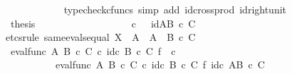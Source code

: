 \begin{isabellebody}
\ \ \ \ \ \ \ \ \ \ \isamarkupfalse%
\ {\isacharparenleft}{\kern0pt}typecheck{\isacharunderscore}{\kern0pt}cfuncs{\isacharcomma}{\kern0pt}\ simp\ add{\isacharcolon}{\kern0pt}\ id{\isacharunderscore}{\kern0pt}cross{\isacharunderscore}{\kern0pt}prod\ id{\isacharunderscore}{\kern0pt}right{\isacharunderscore}{\kern0pt}unit{}{\isacharparenright}{\kern0pt}\isanewline
\ \ \ \ \ \ \ \ \isamarkupfalse%
\ \isamarkupfalse%
\ {\isacharquery}{\kern0pt}thesis\isacommand{{\isachardot}{\kern0pt}}\isamarkupfalse%
\isanewline
\ \ \ \ \ \ \isamarkupfalse%
\isanewline
\ \ \ \ \isamarkupfalse%
\isanewline
\ \ \isamarkupfalse%
\isanewline
\ \ \isamarkupfalse%
\ {\isachardoublequoteopen}{\isasympsi}\isactrlsup {\isasymsharp}\ {\isasymcirc}\isactrlsub c\ {\isasymphi}\isactrlsup {\isasymsharp}\isactrlsup {\isasymsharp}\ {\isacharequal}{\kern0pt}\ id{\isacharparenleft}{\kern0pt}A\isactrlbsup {\isacharparenleft}{\kern0pt}B\ {\isasymtimes}\isactrlsub c\ C{\isacharparenright}{\kern0pt}\isactrlesup {\isacharparenright}{\kern0pt}{\isachardoublequoteclose}\isanewline
\ \ \isamarkupfalse%
{\isacharparenleft}{\kern0pt}etcs{\isacharunderscore}{\kern0pt}rule\ same{\isacharunderscore}{\kern0pt}evals{\isacharunderscore}{\kern0pt}equal{\isacharbrackleft}{\kern0pt}\ X\ {\isacharequal}{\kern0pt}\ {\isachardoublequoteopen}A{\isachardoublequoteclose}{\isacharcomma}{\kern0pt}\ \ A\ {\isacharequal}{\kern0pt}\ {\isachardoublequoteopen}{\isacharparenleft}{\kern0pt}B\ {\isasymtimes}\isactrlsub c\ C{\isacharparenright}{\kern0pt}{\isachardoublequoteclose}{\isacharbrackright}{\kern0pt}{\isacharparenright}{\kern0pt}\isanewline
\ \ \ \ \isamarkupfalse%
\ {\isachardoublequoteopen}eval{\isacharunderscore}{\kern0pt}func\ A\ {\isacharparenleft}{\kern0pt}B\ {\isasymtimes}\isactrlsub c\ C{\isacharparenright}{\kern0pt}\ {\isasymcirc}\isactrlsub c\ {\isacharparenleft}{\kern0pt}id\isactrlsub c\ {\isacharparenleft}{\kern0pt}B\ {\isasymtimes}\isactrlsub c\ C{\isacharparenright}{\kern0pt}\ {\isasymtimes}\isactrlsub f\ {\isacharparenleft}{\kern0pt}{\isasympsi}\isactrlsup {\isasymsharp}\ {\isasymcirc}\isactrlsub c\ {\isasymphi}\isactrlsup {\isasymsharp}\isactrlsup {\isasymsharp}{\isacharparenright}{\kern0pt}{\isacharparenright}{\kern0pt}\ {\isacharequal}{\kern0pt}\ \isanewline
\ \ \ \ \ \ \ \ \ \ eval{\isacharunderscore}{\kern0pt}func\ A\ {\isacharparenleft}{\kern0pt}B\ {\isasymtimes}\isactrlsub c\ C{\isacharparenright}{\kern0pt}\ {\isasymcirc}\isactrlsub c\ id\isactrlsub c\ {\isacharparenleft}{\kern0pt}B\ {\isasymtimes}\isactrlsub c\ C{\isacharparenright}{\kern0pt}\ {\isasymtimes}\isactrlsub f\ id\isactrlsub c\ {\isacharparenleft}{\kern0pt}A\isactrlbsup {\isacharparenleft}{\kern0pt}B\ {\isasymtimes}\isactrlsub c\ C{\isacharparenright}{\kern0pt}\isactrlesup {\isacharparenright}{\kern0pt}{\isachardoublequoteclose}\isanewline

\end{isabellebody}
